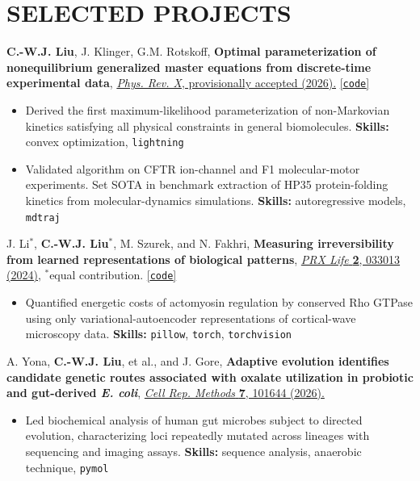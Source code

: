 \documentclass[11pt,letterpaper]{article}
\newcommand{\publication}[1]{#1\par}
\newcommand{\projectsep}{\par\vspace{2pt}}
\begin{document}
\section{SELECTED PROJECTS}
\publication{\textbf{C.-W.J. Liu}, J. Klinger, G.M. Rotskoff, \textbf{Optimal parameterization of nonequilibrium generalized master equations from discrete-time experimental data}, \href{https://doi.org/10.48550/arXiv.2606.28289}{\textit{Phys. Rev. X}, provisionally accepted (2026).} \href{https://github.com/rotskoff-group/GMEx}{[\texttt{code}]}}
\begin{itemize}
\item Derived the first maximum-likelihood parameterization of non-Markovian kinetics satisfying all physical constraints in general biomolecules. \textbf{Skills:} convex optimization, \texttt{lightning}
\item Validated algorithm on CFTR ion-channel and F1 molecular-motor experiments. Set SOTA in benchmark extraction of HP35 protein-folding kinetics from molecular-dynamics simulations. \textbf{Skills:} autoregressive models, \texttt{mdtraj}
\end{itemize}
\projectsep
\publication{J. Li$^*$, \textbf{C.-W.J. Liu}$^*$, M. Szurek, and N. Fakhri, \textbf{Measuring irreversibility from learned representations of biological patterns}, \href{https://doi.org/10.1103/PRXLife.2.033013}{\textit{PRX Life} \textbf{2}, 033013 (2024),} $^*$equal contribution. \href{https://github.com/cjoshliu/irreversibility-from-representations}{[\texttt{code}]}}
\begin{itemize}
\item Quantified energetic costs of actomyosin regulation by conserved Rho GTPase using only variational-autoencoder representations of cortical-wave microscopy data.
\textbf{Skills:} \texttt{pillow}, \texttt{torch}, \texttt{torchvision}
\end{itemize}
\projectsep
\publication{A. Yona, \textbf{C.-W.J. Liu}, et al., and J. Gore, \textbf{Adaptive evolution identifies candidate genetic routes associated with oxalate utilization in probiotic and gut-derived \textit{E. coli}}, \href{https://doi.org/10.1016/j.crmeth.2026.101644}{\textit{Cell Rep. Methods} \textbf{7}, 101644 (2026).}}
\begin{itemize}
\item Led biochemical analysis of human gut microbes subject to directed evolution,
characterizing loci repeatedly mutated across lineages with sequencing and imaging assays.
\textbf{Skills:} sequence analysis, anaerobic technique, \texttt{pymol}
\end{itemize}
\end{document}
